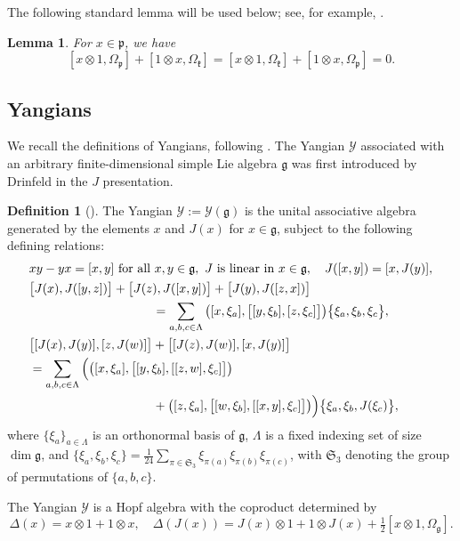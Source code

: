 \documentclass[11pt,reqno]{amsart}
\numberwithin{equation}{section}
\newtheorem{lem}[thm]{Lemma}
\theoremstyle{definition}
\newtheorem{dfn}[thm]{Definition}
\theoremstyle{remark}
\newcommand{\beq}{\begin{equation}}
\newcommand{\eeq}{\end{equation}}
\newcommand{\g}{\mathfrak{g}}
\newcommand{\fkS}{\mathfrak{S}}
\newcommand{\Y}{{\mathscr{Y}}}
\begin{document}
The following standard lemma will be used below; see, for example, \cite[Lemma~2.1]{Lu26min}.
\begin{lem}\label{lem:omega}
For $x\in\mathfrak p$, we have
\[
[x\otimes 1,\Omega_{\mathfrak p}]+[1\otimes x,\Omega_{\mathfrak k}]=[x\otimes 1,\Omega_{\mathfrak k}]+[1\otimes x,\Omega_{\mathfrak p}]=0.
\]
\end{lem}


\subsection{Yangians}\label{sec:Yang}
We recall the definitions of Yangians, following \cite{GNW18}. The Yangian $\Y$ associated with an arbitrary finite-dimensional simple Lie algebra $\g$ was first introduced by Drinfeld in the $J$ presentation.
\begin{dfn}[\cite{Dri85}]
\label{def:Y-J}
The Yangian $\Y:=\Y(\g)$ is the unital associative algebra generated by the elements $x$ and $J(x)$ for $x\in\g$, subject to the following defining relations:
\begin{equation*}
\begin{split}
&xy-yx = [x,y] \text{ for all } x,y\in\g,  \text{ $J$ is linear in }  x\in\g, \quad
   J([x,y]) = [x, J(y)],
\\
  &\big[J(x), J([y,z])\big] + \big[J(z), J([x,y])\big] + \big[J(y), J([z,x])\big]\\
  &\hskip3.5cm = \sum_{a,b,c\in \Lambda} \big([x,\xi_a],\big[[y,\xi_b],[z,\xi_c]\big]\big) \big\{ \xi_a,\xi_b,\xi_c \big\},
\\
  &\big[[J(x), J(y)], [z, J(w)]\big] + \big[[J(z), J(w)], [x, J(y)]\big]\\
 &=  \sum_{a,b,c\in \Lambda} \Big(\big([x,\xi_a],\big[[y,\xi_b],[[z,w],\xi_c]\big]\big) \\&
 \hskip3.5cm + \big([z,\xi_a],\big[[w,\xi_b],[[x,y],\xi_c]\big]\big) \Big)\big\{ \xi_a,\xi_b,J(\xi_c) \big\},
\end{split}
\end{equation*}
where $\{ \xi_a \}_{a \in \Lambda}$ is an orthonormal basis of $\g$, $\Lambda$ is a fixed indexing set of size $\dim \g$, and $\{ \xi_a,\xi_b,\xi_c \} = \frac{1}{24} \sum_{\pi\in \fkS_3} \xi_{\pi(a)} \xi_{\pi(b)} \xi_{\pi(c)}$, with $\fkS_3$ denoting the group of permutations of $\{ a,b,c\}$.
\end{dfn}

The Yangian $\Y$ is a Hopf algebra with the coproduct determined by
\beq\label{copro-J}
\Delta(x)=x\otimes 1+1\otimes x,\quad \Delta(J(x))=J(x)\otimes 1+1\otimes J(x)+\tfrac12[x\otimes 1,\Omega_\g].
\eeq
\end{document}

